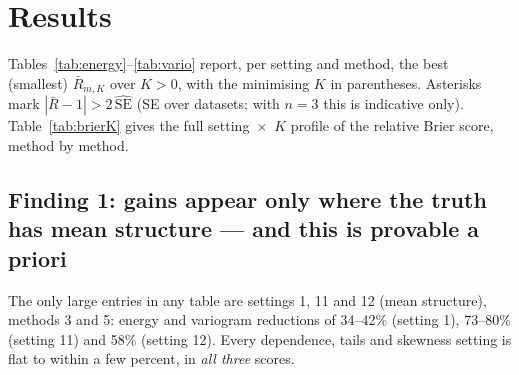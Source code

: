 \documentclass[11pt]{article}
\begin{document}
\section{Results}

Tables~\ref{tab:energy}--\ref{tab:vario} report, per setting and method, the
best (smallest) $\bar R_{m,K}$ over $K>0$, with the minimising $K$ in
parentheses. Asterisks mark $|\bar R - 1| > 2\,\widehat{\mathrm{SE}}$ (SE over
datasets; with $n=3$ this is indicative only). Table~\ref{tab:brierK} gives the
full setting~$\times$~$K$ profile of the relative Brier score, method by
method.

\begin{table}[ht]
\centering\small
\caption{\textbf{Energy score}, best over $K>0$ relative to the same method's
$K=0$ (minimising $K$ in parentheses). Values $<1$: MRTS helps; bold:
$\bar R < 0.75$.}
\label{tab:energy}

\end{table}

\begin{table}[ht]
\centering\small
\caption{\textbf{Brier score} (mean over the 11 exceedance levels), best over
$K>0$ relative to own $K=0$. Bold: $\bar R < 0.75$.}
\label{tab:brier}

\end{table}

\begin{table}[ht]
\centering\small
\caption{\textbf{Variogram score} ($p = 1/2$), best over $K>0$ relative to own
$K=0$. Bold: $\bar R < 0.75$.}
\label{tab:vario}

\end{table}





\subsection{Finding 1: gains appear only where the truth has mean structure ---
and this is provable a priori}

The only large entries in any table are settings 1, 11 and 12 (mean
structure), methods 3 and 5: energy and variogram reductions of 34--42\%
(setting 1), 73--80\% (setting 11) and 58\% (setting 12). Every dependence,
tails and skewness setting is flat to within a few percent, in \emph{all
three} scores.
\end{document}
